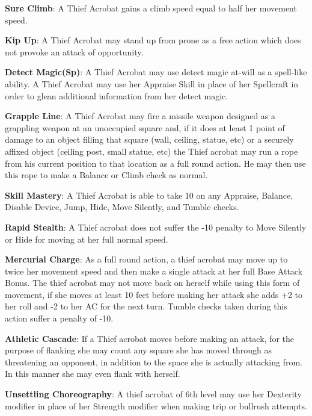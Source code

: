 \textbf{Sure Climb}: A Thief Acrobat gains a climb speed equal to half her movement speed.

\textbf{Kip Up}: A Thief Acrobat may stand up from prone as a free action which does not provoke an attack of opportunity.

\textbf{Detect Magic(Sp)}: A Thief Acrobat may use detect magic at-will as a spell-like ability. A Thief Acrobat may use her Appraise Skill in place of her Spellcraft in order to glean additional information from her detect magic.

\textbf{Grapple Line}: A Thief Acrobat may fire a missile weapon designed as a grappling weapon at an unoccupied square and, if it does at least 1 point of damage to an object filling that square (wall, ceiling, statue, etc) or a securely affixed object (ceiling post, small statue, etc) the Thief acrobat may run a rope from his current position to that location as a full round action. He may then use this rope to make a Balance or Climb check as normal.

\textbf{Skill Mastery}: A Thief Acrobat is able to take 10 on any Appraise, Balance, Disable Device, Jump, Hide, Move Silently, and Tumble checks. 

\textbf{Rapid Stealth}: A Thief acrobat does not suffer the -10 penalty to Move Silently or Hide for moving at her full normal speed.

\textbf{Mercurial Charge}: As a full round action, a thief acrobat may move up to twice her movement speed and then make a single attack at her full Base Attack Bonus. The thief acrobat may not move back on herself while using this form of movement, if she moves at least 10 feet before making her attack she adds +2 to her roll and -2 to her AC for the next turn. Tumble checks taken during this action suffer a penalty of -10.

\textbf{Athletic Cascade}: If a Thief acrobat moves before making an attack, for the purpose of flanking she may count any square she has moved through as threatening an opponent, in addition to the space she is actually attacking from. In this manner she may even flank with herself.

\textbf{Unsettling Choreography}: A thief acrobat of 6th level may use her Dexterity modifier in place of her Strength modifier when making trip or bullrush attempts.